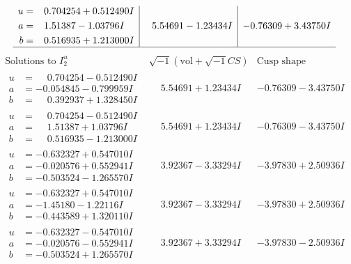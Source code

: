 \documentclass[1p]{elsarticle_modified}
\theoremstyle{definition}
\newcommand{\I}{\sqrt{-1}}
\begin{document}
$$\begin{array}{c|c|c}
\begin{aligned}
u &= \phantom{-}0.704254 + 0.512490 I \\
a &= \phantom{-}1.51387 - 1.03796 I \\
b &= \phantom{-}0.516935 + 1.213000 I\end{aligned}
 & \phantom{-}5.54691 - 1.23434 I & -0.76309 + 3.43750 I\\
 \hline 
 \end{array}$$\newpage$$\begin{array}{c|c|c}  
\text{Solutions to }I^u_{2}& \I (\text{vol} + \sqrt{-1}CS) & \text{Cusp shape}\\
 \hline 
\begin{aligned}
u &= \phantom{-}0.704254 - 0.512490 I \\
a &= -0.054845 - 0.799959 I \\
b &= \phantom{-}0.392937 + 1.328450 I\end{aligned}
 & \phantom{-}5.54691 + 1.23434 I & -0.76309 - 3.43750 I \\ \hline\begin{aligned}
u &= \phantom{-}0.704254 - 0.512490 I \\
a &= \phantom{-}1.51387 + 1.03796 I \\
b &= \phantom{-}0.516935 - 1.213000 I\end{aligned}
 & \phantom{-}5.54691 + 1.23434 I & -0.76309 - 3.43750 I \\ \hline\begin{aligned}
u &= -0.632327 + 0.547010 I \\
a &= -0.020576 + 0.552941 I \\
b &= -0.503524 - 1.265570 I\end{aligned}
 & \phantom{-}3.92367 - 3.33294 I & -3.97830 + 2.50936 I \\ \hline\begin{aligned}
u &= -0.632327 + 0.547010 I \\
a &= -1.45180 - 1.22116 I \\
b &= -0.443589 + 1.320110 I\end{aligned}
 & \phantom{-}3.92367 - 3.33294 I & -3.97830 + 2.50936 I \\ \hline\begin{aligned}
u &= -0.632327 - 0.547010 I \\
a &= -0.020576 - 0.552941 I \\
b &= -0.503524 + 1.265570 I\end{aligned}
 & \phantom{-}3.92367 + 3.33294 I & -3.97830 - 2.50936 I \\ \hline\begin{aligned}

\end{aligned}
\end{array}$$
\end{document}
